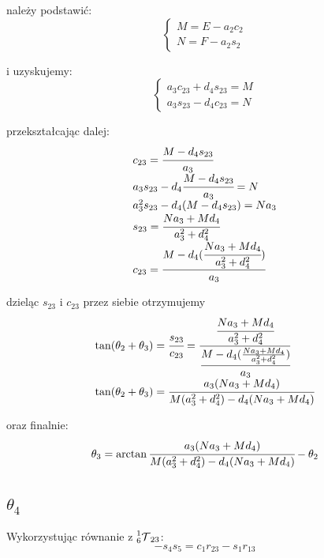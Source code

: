 \documentclass[]{article}
\newcommand\T{\mathcal{T}}
\begin{document}
należy podstawić:
\begin{equation}\left\{\begin{array}{l}
M = E - a_2c_2 \\
N = F - a_2s_2
\end{array}\right.\end{equation}

i uzyskujemy:
\begin{equation}\left\{\begin{array}{l}
a_3c_{23} + d_4s_{23} = M \\
a_3s_{23} - d_4c_{23} = N
\end{array}\right.\end{equation}

przekształcając dalej:
\begin{equation}\begin{array}{l}
c_{23} = \cfrac{M - d_4s_{23}}{a_3} \\
a_3s_{23} - d_4\cfrac{M - d_4s_{23}}{a_3} = N \\
a_3^2s_{23} - d_4(M - d_4s_{23}) = Na_3 \\
s_{23} = \cfrac{Na_3 + Md_4}{a_3^2 + d_4^2} \\
c_{23} = \cfrac{M - d_4(\cfrac{Na_3 + Md_4}{a_3^2 + d_4^2})}{a_3}
\end{array}\end{equation}

dzieląc $s_{23}$ i $c_{23}$ przez siebie otrzymujemy
\begin{equation}\begin{array}{l}
\tan(\theta_2 + \theta_3) = \cfrac{s_{23}}{c_{23}} = \cfrac{\cfrac{Na_3 + Md_4}{a_3^2 + d_4^2}}{\cfrac{M - d_4(\frac{Na_3 + Md_4}{a_3^2 + d_4^2})}{a_3}} \\
\tan(\theta_2 + \theta_3) = \cfrac{a_3(Na_3 + Md_4)}{M(a_3^2 + d_4^2) - d_4(Na_3 + Md_4)} \\
\end{array}\end{equation}

oraz finalnie:
\begin{equation}
\theta_3 = \arctan{\cfrac{a_3(Na_3 + Md_4)}{M(a_3^2 + d_4^2) - d_4(Na_3 + Md_4)}} - \theta_2
\end{equation}

\subsection{$\theta_4$}
Wykorzystując równanie z $\prescript{1}{6}{\T}_{23}$:
\begin{equation}
- s_4s_5 = c_1r_{23} - s_1r_{13}
\end{equation}
\end{document}
